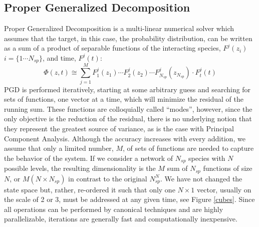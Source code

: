 \documentclass{article}
\begin{document}
\subsection{Proper Generalized Decomposition}\label{PGD}
Proper Generalized Decomposition \cite{chinesta2011overview,chinesta2013pgd} is a multi-linear numerical solver which assumes that the target, in this case, the probability distribution, can be written as a sum of a product of separable functions of the interacting species, $F^j(z_i)$ $i=\{1\cdots N_{sp}\}$, and time, $F^j(t)$:
\[
 \Phi(z,t)\cong \sum_{j=1}^{M}F_1^j(z_1)\cdots F_2^j(z_2)\cdots F_{N_{sp}}^j(z_{N_{sp}}) \cdot F_t^j(t)
\]
PGD is performed iteratively, starting at some arbitrary guess and searching for sets of functions, one vector at a time, which will minimize the residual of the running sum. These functions are colloquially called ``modes'', however, since the only objective is the reduction of the residual, there is no underlying notion that they represent the greatest source of variance, as is the case with Principal Component Analysis. Although the accuracy increases with every addition, we assume that only a limited number, $M$, of sets of functions are needed to capture the behavior of the system. If we consider a network of $N_{sp}$ species with $N$ possible levels, the resulting dimensionality is the $M$ sum of $N_{sp}$ functions of size $N$, or $M(N\times N_{sp})$ in contrast to the original $N_{sp}^N$. We have not changed the state space but, rather, re-ordered it such that only one $N\times1$ vector, usually on the scale of 2 or 3, must be addressed at any given time, see Figure \ref{cubes}. Since all operations can be performed by canonical techniques and are highly parallelizable, iterations are generally fast and computationally inexpensive.
\end{document}
